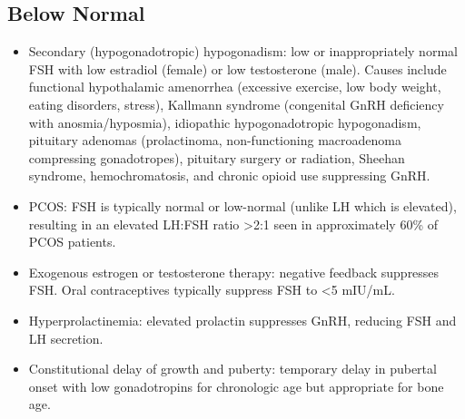 \subsection*{Below Normal}
\begin{itemize}
  \item Secondary (hypogonadotropic) hypogonadism: low or inappropriately normal FSH with low estradiol (female) or low testosterone (male). Causes include functional hypothalamic amenorrhea (excessive exercise, low body weight, eating disorders, stress), Kallmann syndrome (congenital GnRH deficiency with anosmia/hyposmia), idiopathic hypogonadotropic hypogonadism, pituitary adenomas (prolactinoma, non-functioning macroadenoma compressing gonadotropes), pituitary surgery or radiation, Sheehan syndrome, hemochromatosis, and chronic opioid use suppressing GnRH.
  \item PCOS: FSH is typically normal or low-normal (unlike LH which is elevated), resulting in an elevated LH:FSH ratio >2:1 seen in approximately 60\% of PCOS patients.
  \item Exogenous estrogen or testosterone therapy: negative feedback suppresses FSH. Oral contraceptives typically suppress FSH to <5 mIU/mL.
  \item Hyperprolactinemia: elevated prolactin suppresses GnRH, reducing FSH and LH secretion.
  \item Constitutional delay of growth and puberty: temporary delay in pubertal onset with low gonadotropins for chronologic age but appropriate for bone age.
\end{itemize}

